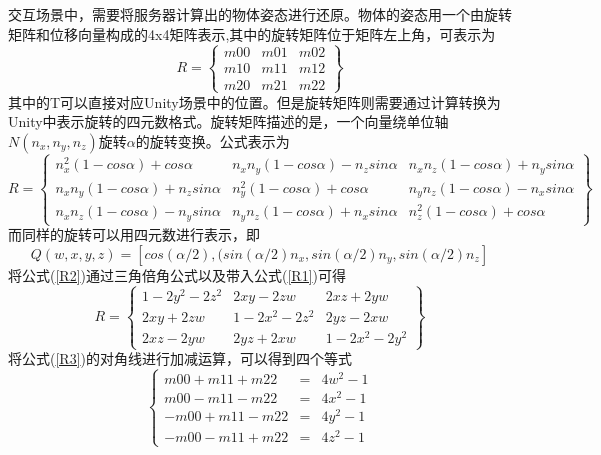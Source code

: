 交互场景中，需要将服务器计算出的物体姿态进行还原。物体的姿态用一个由旋转矩阵和位移向量构成的4x4矩阵表示,其中的旋转矩阵位于矩阵左上角，可表示为
\begin{equation} 
R = 
 \begin{Bmatrix}
   m00 & m01 & m02 \\
   m10 & m11 & m12 \\
   m20 & m21 & m22  
  \end{Bmatrix}
\end{equation} 
  其中的T可以直接对应Unity场景中的位置。但是旋转矩阵则需要通过计算转换为Unity中表示旋转的四元数格式。旋转矩阵描述的是，一个向量绕单位轴$N(n_x, n_y, n_z)$旋转$\alpha$的旋转变换。公式表示为
  \begin{equation}\label{R1}
 R = 
  \begin{Bmatrix}
   n_x^2(1-cos\alpha)+cos\alpha & n_x n_y(1-cos\alpha) - n_zsin\alpha & n_x n_z(1-cos\alpha) + n_ysin\alpha \\
   n_x n_y(1-cos\alpha) + n_zsin\alpha & n_y^2(1-cos\alpha) + cos\alpha & n_y n_z(1-cos\alpha) - n_xsin\alpha \\
   n_x n_z(1-cos\alpha) - n_ysin\alpha & n_y n_z(1-cos\alpha) + n_xsin\alpha & n_z^2(1-cos\alpha) + cos\alpha 
  \end{Bmatrix}
\end{equation}
而同样的旋转可以用四元数进行表示，即
  \begin{equation}\label{R2}
Q(w, x, y, z) = [cos(\alpha/2), (sin(\alpha/2)n_x, sin(\alpha/2)n_y, sin(\alpha/2)n_z]
\end{equation}
将公式(\ref{R2})通过三角倍角公式以及带入公式(\ref{R1})可得
  \begin{equation}\label{R3}
 R = 
  \begin{Bmatrix}
   1-2y^2-2z^2 & 2xy-2zw & 2xz+2yw \\
   2xy+2zw & 1-2x^2-2z^2 & 2yz - 2xw \\
   2xz - 2yw & 2yz + 2xw & 1-2x^2-2y^2
  \end{Bmatrix}
\end{equation}
将公式(\ref{R3})的对角线进行加减运算，可以得到四个等式
\begin{equation}\label{R4}
\left\{
\begin{aligned}
m00 + m11 + m22 &=& 4w^2 - 1 \\
m00 - m11 - m22 &=& 4x^2 - 1 \\
-m00 + m11 - m22 &=& 4y^2 - 1 \\
-m00 - m11 + m22 &=& 4z^2 - 1 
\end{aligned}
\right.
\end{equation}
